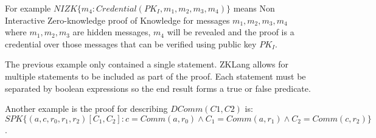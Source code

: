 \documentclass[a4paper]{article}
\begin{document}
For example $NIZK\{m_4: Credential(PK_I, m_1, m_2, m_3, m_4)\}$ means Non Interactive Zero-knowledge proof of Knowledge for messages $m_1, m_2, m_3, m_4$ where $m_1, m_2, m_3$ are hidden messages, $m_4$ will be revealed and the proof is a credential over those messages that can be verified using public key $PK_I$.

The previous example only contained a single statement. ZKLang allows for multiple statements to be included as part of the proof. Each statement must be separated by boolean expressions so the end result forms a true or false predicate.

Another example is the proof for describing $DComm(C1, C2)$ is: $SPK\{(a, c, r_0, r_1, r_2)[C_1, C_2]: c=Comm(a, r_0) \wedge C_1 = Comm(a, r_1) \wedge C_2 = Comm(c, r_2)\}$. \newline



\end{document}
